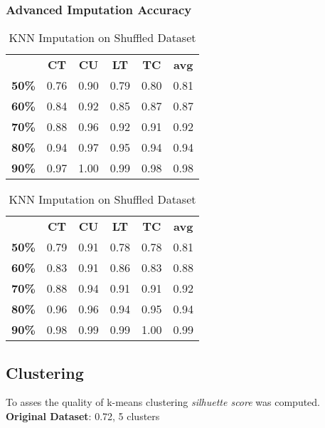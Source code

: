 \documentclass{article}
\begin{document}
\subsubsection{Advanced Imputation Accuracy}
\begin{table}[h]
\begin{minipage}{.45\textwidth}\centering
\begin{tabular}{cccccc}
			  & \textbf{CT} & \textbf{CU} & \textbf{LT} & \textbf{TC} & \textbf{avg} \\
\textbf{50\%} & 0.76        & 0.90        & 0.79        & 0.80        & 0.81 \\
\textbf{60\%} & 0.84        & 0.92        & 0.85        & 0.87        & 0.87 \\
\textbf{70\%} & 0.88        & 0.96        & 0.92        & 0.91        & 0.92 \\
\textbf{80\%} & 0.94        & 0.97        & 0.95        & 0.94        & 0.94 \\
\textbf{90\%} & 0.97        & 1.00        & 0.99        & 0.98        & 0.98
\end{tabular}
\caption{KNN Imputation}
\end{minipage}
\hfill
\begin{minipage}{.5\textwidth}\centering
\begin{tabular}{cccccc}
			  & \textbf{CT} & \textbf{CU} & \textbf{LT} & \textbf{TC} & \textbf{avg} \\
\textbf{50\%} & 0.79        & 0.91        & 0.78        & 0.78        & 0.81 \\
\textbf{60\%} & 0.83        & 0.91        & 0.86        & 0.83        & 0.88 \\
\textbf{70\%} & 0.88        & 0.94        & 0.91        & 0.91        & 0.92 \\
\textbf{80\%} & 0.96        & 0.96        & 0.94        & 0.95        & 0.94 \\
\textbf{90\%} & 0.98        & 0.99        & 0.99        & 1.00        & 0.99
\end{tabular}
\caption{KNN Imputation on Shuffled Dataset}
\end{minipage}
\end{table}

\subsection{Clustering}
To asses the quality of k-means clustering \emph{silhuette score} was computed.\\
\textbf{Original Dataset}: 0.72, 5 clusters
\end{document}
